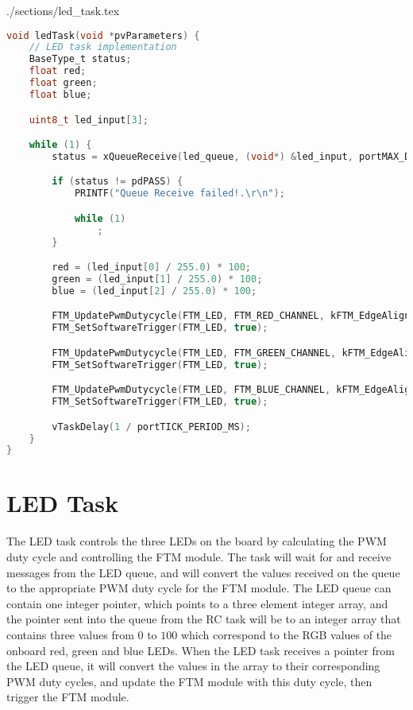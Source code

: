 \begin{filecontents}[overwrite]{./sections/led_task.tex}
\begin{lstlisting}[language=c,caption=LED Task, label=list:led]
void ledTask(void *pvParameters) {
    // LED task implementation
    BaseType_t status;
    float red;
    float green;
    float blue;

    uint8_t led_input[3];

    while (1) {
        status = xQueueReceive(led_queue, (void*) &led_input, portMAX_DELAY);

        if (status != pdPASS) {
            PRINTF("Queue Receive failed!.\r\n");

            while (1)
                ;
        }

        red = (led_input[0] / 255.0) * 100;
        green = (led_input[1] / 255.0) * 100;
        blue = (led_input[2] / 255.0) * 100;

        FTM_UpdatePwmDutycycle(FTM_LED, FTM_RED_CHANNEL, kFTM_EdgeAlignedPwm, (uint8_t) red);
        FTM_SetSoftwareTrigger(FTM_LED, true);

        FTM_UpdatePwmDutycycle(FTM_LED, FTM_GREEN_CHANNEL, kFTM_EdgeAlignedPwm, (uint8_t) green);
        FTM_SetSoftwareTrigger(FTM_LED, true);

        FTM_UpdatePwmDutycycle(FTM_LED, FTM_BLUE_CHANNEL, kFTM_EdgeAlignedPwm, (uint8_t) blue);
        FTM_SetSoftwareTrigger(FTM_LED, true);

        vTaskDelay(1 / portTICK_PERIOD_MS);
    }
}
\end{lstlisting}
\end{filecontents}

\section*{LED Task}

The LED task controls the three LEDs on the board by calculating the PWM duty cycle and controlling the FTM module. The task will wait for and receive messages from the LED queue, and will convert the values received on the queue to the appropriate PWM duty cycle for the FTM module. The LED queue can contain one integer pointer, which points to a three element integer array, and the pointer sent into the queue from the RC task will be to an integer array that contains three values from $0$ to $100$ which correspond to the RGB values of the onboard red, green and blue LEDs. When the LED task receives a pointer from the LED queue, it will convert the values in the array to their corresponding PWM duty cycles, and update the FTM module with this duty cycle, then trigger the FTM module.

